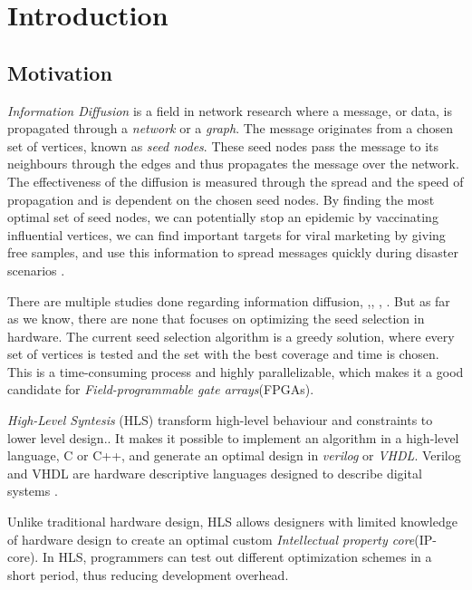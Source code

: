 \chapter{Introduction} \label{intro}

\section{Motivation}
\textit{Information Diffusion} is a field in network research where a message, or data, is propagated through a \textit{network} or a \textit{graph}. The message originates from a chosen set of vertices, known as \textit{seed nodes}. These seed nodes pass the message to its neighbours through the edges and thus propagates the message over the network. The effectiveness of the diffusion is measured through the spread and the speed of propagation and is dependent on the chosen seed nodes. By finding the most optimal set of seed nodes, we can potentially stop an epidemic by vaccinating influential vertices, we can find important targets for viral marketing by giving free samples, and use this information to spread messages quickly during disaster scenarios\cite{InformationDiffusionThroughBlogspace} \cite{Romero:2011:DMI:1963405.1963503}.

There are multiple studies done regarding information diffusion, \cite{InformationDiffusionThroughBlogspace},\cite{cha2010measuring},  \cite{5694014},  \cite{InfoDiffAndExternalInfluInNetworks}. But as far as we know, there are none that focuses on optimizing the seed selection in hardware. The current seed selection algorithm is a greedy solution\cite{greedyInfluenc2005}, where every set of vertices is tested and the set with the best coverage and time is chosen. This is a time-consuming process and highly parallelizable, which makes it a good candidate for \textit{Field-programmable gate arrays}(FPGAs). 

\textit{High-Level Syntesis} (HLS) transform high-level behaviour and constraints to lower level design.\cite{52214}. It makes it possible to implement an algorithm in a high-level language, C or C++, and generate an optimal design in \textit{verilog} or \textit{VHDL}. Verilog and VHDL are hardware descriptive languages designed to describe digital systems \cite{thomas2008verilog}. 

Unlike traditional hardware design, HLS allows designers with limited knowledge of hardware design to create an optimal custom \textit{Intellectual property core}(IP-core). In HLS, programmers can test out different optimization schemes in a short period, thus reducing development overhead.  


